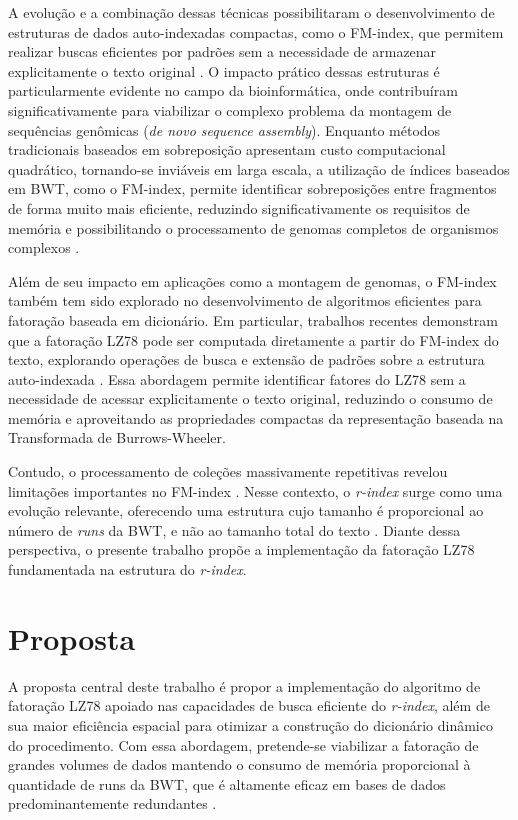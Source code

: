 \documentclass[licenciatura]{pre-projeto-computacao}
\begin{document}
A evolução e a combinação dessas técnicas possibilitaram o desenvolvimento de estruturas de dados auto-indexadas compactas, como o FM-index, que permitem realizar buscas eficientes por padrões sem a necessidade de armazenar explicitamente o texto original \cite{oportunisticDataStructures, indexingCompressedText}.
O impacto prático dessas estruturas é particularmente evidente no campo da bioinformática, onde contribuíram significativamente para viabilizar o complexo problema da montagem de sequências genômicas (\textit{de novo sequence assembly}).
Enquanto métodos tradicionais baseados em sobreposição apresentam custo computacional quadrático, tornando-se inviáveis em larga escala, a utilização de índices baseados em BWT, como o FM-index, permite identificar sobreposições entre fragmentos de forma muito mais eficiente, reduzindo significativamente os requisitos de memória e possibilitando o processamento de genomas completos de organismos complexos \cite{assemblySringGraphFMIndex}.

Além de seu impacto em aplicações como a montagem de genomas, o FM-index também tem sido explorado no desenvolvimento de algoritmos eficientes para fatoração baseada em dicionário. 
Em particular, trabalhos recentes demonstram que a fatoração LZ78 pode ser computada diretamente a partir do FM-index do texto, explorando operações de busca e extensão de padrões sobre a estrutura auto-indexada \cite{LZ78FMIndex}.
Essa abordagem permite identificar fatores do LZ78 sem a necessidade de acessar explicitamente o texto original, reduzindo o consumo de memória e aproveitando as propriedades compactas da representação baseada na Transformada de Burrows-Wheeler.

Contudo, o processamento de coleções massivamente repetitivas revelou limitações importantes no FM-index \cite{RefiningRIndex}.
Nesse contexto, o \textit{r-index} surge como uma evolução relevante, oferecendo uma estrutura cujo tamanho é proporcional ao número de \textit{runs} da BWT, e não ao tamanho total do texto \cite{BWTRunsBoundedSpace}.
Diante dessa perspectiva, o presente trabalho propõe a implementação da fatoração LZ78 fundamentada na estrutura do \textit{r-index}.

\section*{Proposta}

A proposta central deste trabalho é propor a implementação do algoritmo de fatoração LZ78 apoiado nas capacidades de busca eficiente do \textit{r-index}, além de sua maior eficiência espacial para otimizar a construção do dicionário dinâmico do procedimento. 
Com essa abordagem, pretende-se viabilizar a fatoração de grandes volumes de dados mantendo o consumo de memória proporcional à quantidade de runs da BWT, que é altamente eficaz em bases de dados predominantemente redundantes \cite{BWTRunsBoundedSpace}.
\end{document}
